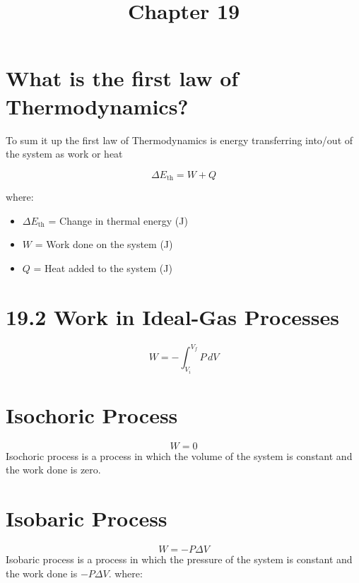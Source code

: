 \documentclass{article}
\begin{document}
\title{Chapter 19}
\author{}
\date{}

\maketitle



\section*{What is the first law of Thermodynamics?}

To sum it up the first law of Thermodynamics is energy transferring into/out of the system as work or heat



\begin{equation}
    \Delta E_{\text{th}} = W + Q
\end{equation}

where:
\begin{itemize}
    \item $\Delta E_{\text{th}}$ = Change in thermal energy (J)
    \item $W$ = Work done on the system (J)
    \item $Q$ = Heat added to the system (J)
\end{itemize}


\section*{19.2 Work in Ideal-Gas Processes}

\begin{equation}
    W = - \int_{V_i}^{V_f} P \, dV
\end{equation}

\section*{Isochoric Process}

\begin{equation}
    W = 0
\end{equation}
Isochoric process is a process in which the volume of the system is constant and the work done is zero.


\section*{Isobaric Process}

    \begin{equation}
        W = - P \Delta V
    \end{equation}
    Isobaric process is a process in which the pressure of the system is constant and the work done is $-P \Delta V$.
    where:
    
\end{document}
